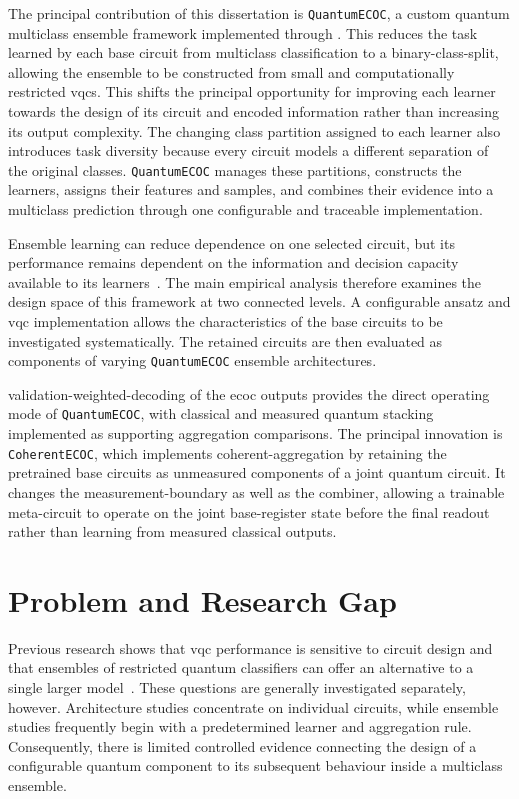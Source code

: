 \documentclass[]{UCD_CS_MSc_AAI_Report}
\begin{document}
The principal contribution of this dissertation is \texttt{QuantumECOC}, a custom quantum multiclass \gls{ensemble} framework implemented through . This reduces the task learned by each base circuit from multiclass classification to a \gls{binary-class-split}, allowing the ensemble to be constructed from small and computationally restricted \acp{vqc}. This shifts the principal opportunity for improving each learner towards the design of its circuit and encoded information rather than increasing its output complexity. The changing class partition assigned to each learner also introduces task diversity because every circuit models a different separation of the original classes. \texttt{QuantumECOC} manages these partitions, constructs the learners, assigns their features and samples, and combines their evidence into a multiclass prediction through one configurable and traceable implementation.

Ensemble learning can reduce dependence on one selected circuit, but its performance remains dependent on the information and decision capacity available to its learners~\cite{dong_survey_2020,incudini_resource_2023,radojicic_reducing_2026}. The main empirical analysis therefore examines the design space of this framework at two connected levels. A configurable \gls{ansatz} and \ac{vqc} implementation allows the characteristics of the base circuits to be investigated systematically. The retained circuits are then evaluated as components of varying \texttt{QuantumECOC} ensemble architectures.

\Gls{validation-weighted-decoding} of the \ac{ecoc} outputs provides the direct operating mode of \texttt{QuantumECOC}, with classical and measured quantum \gls{stacking} implemented as supporting aggregation comparisons. The principal innovation is \texttt{CoherentECOC}, which implements \gls{coherent-aggregation} by retaining the pretrained base circuits as unmeasured components of a joint quantum circuit. It changes the \gls{measurement-boundary} as well as the combiner, allowing a trainable meta-circuit to operate on the joint base-register state before the final readout rather than learning from measured classical outputs.

\section{Problem and Research Gap}
\label{sec:intro-problem-gap}

Previous research shows that \ac{vqc} performance is sensitive to circuit design and that ensembles of restricted quantum classifiers can offer an alternative to a single larger model~\cite{friedrich_quantum_2025,incudini_resource_2023,pinto_composing_2026}. These questions are generally investigated separately, however. Architecture studies concentrate on individual circuits, while ensemble studies frequently begin with a predetermined learner and aggregation rule. Consequently, there is limited controlled evidence connecting the design of a configurable quantum component to its subsequent behaviour inside a multiclass ensemble.
\end{document}
